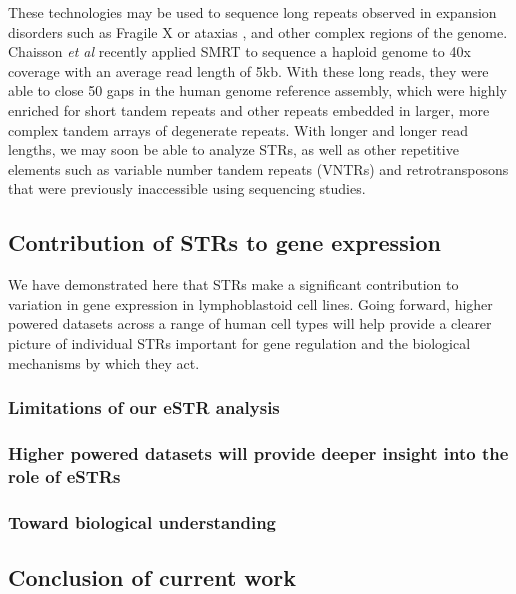 These technologies may be used to sequence long repeats observed in expansion disorders such as Fragile X \cite{LoomisEidPelusoEtAl2012} or ataxias \cite{DoiMonjoHoangEtAl2013}, and other complex regions of the genome. Chaisson \emph{et al} \cite{ChaissonHuddlestonDennisEtAl2015} recently applied SMRT to sequence a haploid genome to 40x coverage with an average read length of 5kb. With these long reads, they were able to close 50 gaps in the human genome reference assembly, which were highly enriched for short tandem repeats and other repeats embedded in larger, more complex tandem arrays of degenerate repeats. With longer and longer read lengths, we may soon be able to analyze STRs, as well as other repetitive elements such as variable number tandem repeats (VNTRs) and retrotransposons that were previously inaccessible using sequencing studies.

\subsection{Contribution of STRs to gene expression}
We have demonstrated here that STRs make a significant contribution to variation in gene expression in lymphoblastoid cell lines. Going forward, higher powered datasets across a range of human cell types will help provide a clearer picture of individual STRs important for gene regulation and the biological mechanisms by which they act.

\subsubsection{Limitations of our eSTR analysis}

\subsubsection{Higher powered datasets will provide deeper insight into the role of eSTRs}

\subsubsection{Toward biological understanding}

\subsection{Conclusion of current work}

